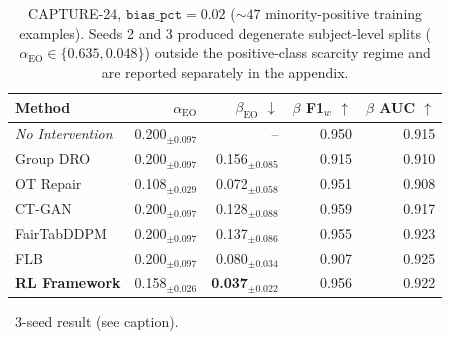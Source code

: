 \begin{table}[ht]
  \centering
  \small
  \caption{CAPTURE-24, $\texttt{bias\_pct}=0.02$ (${\sim}47$ minority-positive training examples). Seeds 2 and 3 produced degenerate subject-level splits ($\alpha_\text{EO} \in \{0.635, 0.048\}$) outside the positive-class scarcity regime and are reported separately in the appendix.}
  \label{tab:capture24_b002}
  \begin{tabular}{lrrrr}
    \toprule
    \textbf{Method} & $\alpha_\text{EO}$ & $\beta_\text{EO}$ $\downarrow$ & $\beta$ F1$_w$ $\uparrow$ & $\beta$ AUC $\uparrow$ \\
    \midrule
    \textit{No Intervention} & 0.200$_{\pm 0.097}$ & -- & 0.950 & 0.915 \\
    \midrule
    Group DRO & 0.200$_{\pm 0.097}$ & 0.156$_{\pm 0.085}$ & 0.915 & 0.910 \\
    OT Repair & 0.108$_{\pm 0.029}$ & 0.072$_{\pm 0.058}$ & 0.951 & 0.908 \\
    CT-GAN & 0.200$_{\pm 0.097}$ & 0.128$_{\pm 0.088}$ & 0.959 & 0.917 \\
    FairTabDDPM & 0.200$_{\pm 0.097}$ & 0.137$_{\pm 0.086}$ & 0.955 & 0.923 \\
    FLB & 0.200$_{\pm 0.097}$ & 0.080$_{\pm 0.034}$ & 0.907 & 0.925 \\
    \textbf{RL Framework} & 0.158$_{\pm 0.026}$ & \textbf{0.037$_{\pm 0.022}$} & 0.956 & 0.922 \\
    \bottomrule
  \end{tabular}
  \vspace{2pt}
  {\footnotesize \dag~3-seed result (see caption).}
\end{table}